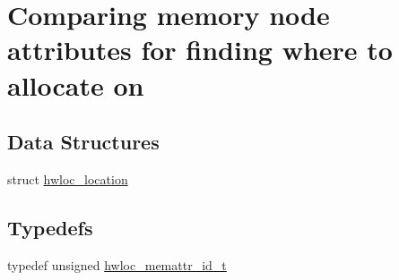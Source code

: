 \hypertarget{a00211}{}\section{Comparing memory node attributes for finding where to allocate on}
\label{a00211}
\subsection*{Data Structures}
\begin{DoxyCompactItemize}
\item 
struct \hyperlink{a00314}{hwloc\+\_\+location}
\end{DoxyCompactItemize}
\subsection*{Typedefs}
\begin{DoxyCompactItemize}
\item 
typedef unsigned \hyperlink{a00211_gacc82003a8610be554615995f0996c888}{hwloc\+\_\+memattr\+\_\+id\+\_\+t}
\end{DoxyCompactItemize}
